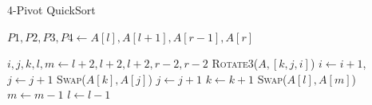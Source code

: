 \documentclass{article}
\begin{document}
\begin{algorithm}[H]
    \caption{4-Pivot QuickSort}\label{4PivotQuickSort}
    \begin{algorithmic}[1]
        
        \State $P1, P2, P3, P4 \gets A[l], A[l+1], A[r-1], A[r]$  

        

        \State $i, j, k, l, m \gets l + 2, l + 2, l + 2, r - 2, r - 2$
             
                    \State \textsc{Rotate3}($A, [k, j, i]$)
                    \State $i \gets i + 1$, $j \gets j + 1$
                    \State \textsc{Swap}($A[k], A[j]$)
                    \State $j \gets j + 1$
                \EndIf
                \State $k \gets k + 1$
            \EndWhile
             
                    \State \textsc{Swap}($A[l], A[m]$)
                    \State $m \gets m - 1$
                \EndIf
                \State $l \gets l - 1$

\end{algorithmic}
\end{algorithm}
\end{document}

